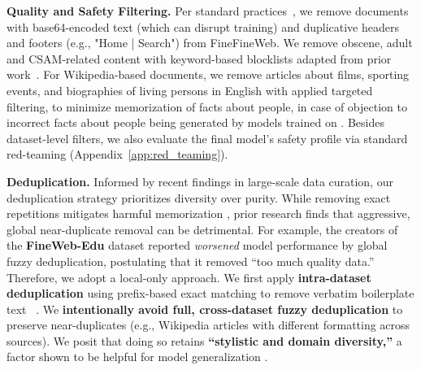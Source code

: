\textbf{Quality and Safety Filtering.} Per standard practices~\citep{raffel2020exploring}, we remove documents with base64-encoded text (which can disrupt training) and duplicative headers and footers (e.g., "Home | Search") from FineFineWeb.
We remove obscene, adult and CSAM-related content with keyword-based blocklists adapted from prior work~\citep{NEURIPS2022_ce9e92e3, nakamura2024auroramopensourcecontinual}. For Wikipedia-based documents, we remove articles about films, sporting events, and biographies of living persons in English with applied targeted filtering, to minimize memorization of facts about people, in case of objection to incorrect facts about people being generated by models trained on \MixtureVitae{}.  Besides dataset-level filters, we also evaluate the final model's safety profile via standard red-teaming (Appendix~\ref{app:red_teaming}).


\textbf{Deduplication.} Informed by recent findings in large-scale data curation, our deduplication strategy prioritizes diversity over purity. While removing exact repetitions mitigates harmful memorization \citep{lee2022deduplicating}, prior research finds that aggressive, global near-duplicate removal can be detrimental. For example, the creators of the \textbf{FineWeb-Edu} dataset \citep{penedo2024} reported \textit{worsened} model performance by global fuzzy deduplication, postulating that it removed ``too much quality data.'' Therefore, we adopt a local-only approach. We first apply \textbf{intra-dataset deduplication} using prefix-based exact matching to remove verbatim boilerplate text ~\citep{lee2022deduplicating}. We \textbf{intentionally avoid full, cross-dataset fuzzy deduplication} to preserve near-duplicates (e.g., Wikipedia articles with different formatting across sources). We posit that doing so retains \textbf{``stylistic and domain diversity,''} a factor shown to be helpful for model generalization \citep{chen2024diversity}.


